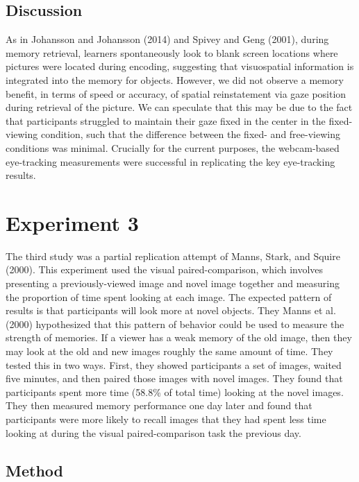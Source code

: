 \documentclass[
  man,floatsintext]{apa6}
\begin{document}
\subsection{Discussion}\label{discussion-2}

As in Johansson and Johansson (2014) and Spivey and Geng (2001), during memory retrieval, learners spontaneously look to blank screen locations where pictures were located
during encoding, suggesting that visuospatial information is integrated into the memory
for objects. However, we did not observe a memory benefit, in terms of speed or accuracy, of spatial reinstatement via gaze position during retrieval of the picture. We can speculate that this may be due to the fact that participants struggled to maintain their gaze fixed in the center in the fixed-viewing condition, such that the difference between the fixed- and free-viewing conditions was minimal. Crucially for the current purposes, the webcam-based eye-tracking measurements were successful in replicating the key eye-tracking results.

\section{Experiment 3}\label{experiment-3}

The third study was a partial replication attempt of
Manns, Stark, and Squire (2000). This experiment used the visual
paired-comparison, which involves presenting a previously-viewed image
and novel image together and measuring the proportion of time spent
looking at each image. The expected pattern of results is that
participants will look more at novel objects. They
Manns et al. (2000) hypothesized that this pattern of
behavior could be used to measure the strength of memories. If a viewer
has a weak memory of the old image, then they may look at the old and
new images roughly the same amount of time. They tested this in two
ways. First, they showed participants a set of images, waited five
minutes, and then paired those images with novel images. They found that
participants spent more time (58.8\% of total time) looking at the novel
images. They then measured memory performance one day later and found
that participants were more likely to recall images that they had spent
less time looking at during the visual paired-comparison task the
previous day.

\subsection{Method}\label{method-3}
\end{document}
